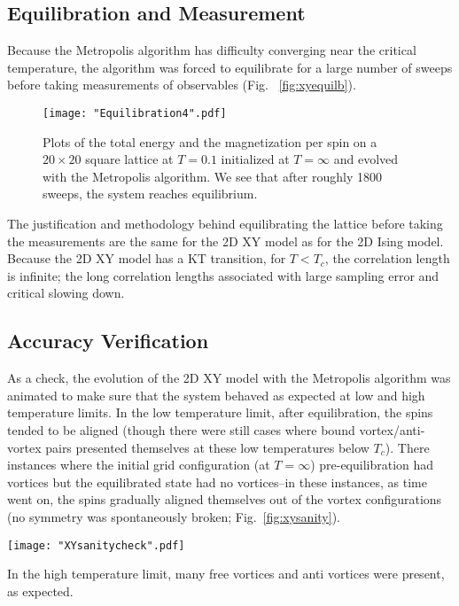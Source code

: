 \documentclass[twocolumn,aps,prl]{revtex4-1} %
\begin{document}
\subsection{Equilibration and Measurement}

Because the Metropolis algorithm has difficulty converging near the critical temperature, the algorithm was forced to equilibrate for a large number of sweeps before taking measurements of observables (Fig.~ \ref{fig:xyequilb}).
\begin{figure}
	\texttt{[image: "Equilibration4".pdf]}
	\caption{\label{fig:xyequiilb} Plots of the total energy and the magnetization per spin on a $20 \times 20$ square lattice at $T = 0.1$ initialized at $T = \infty$ and evolved with the Metropolis algorithm. We see that after roughly 1800 sweeps, the system reaches equilibrium.}
\end{figure}
The justification and methodology behind equilibrating the lattice before taking the measurements are the same for the 2D XY model as for the 2D Ising model. Because the 2D XY model has a KT transition, for $T < T_c$, the correlation length is infinite; the long correlation lengths associated with large sampling error and critical slowing down.

\subsection{Accuracy Verification}

As a check, the evolution of the 2D XY model with the Metropolis algorithm was animated to make sure that the system behaved as expected at low and high temperature limits. In the low temperature limit, after equilibration, the spins tended to be aligned (though there were still cases where bound vortex/anti-vortex pairs presented themselves at these low temperatures below $T_c$). There instances where the initial grid configuration (at $T = \infty$) pre-equilibration had vortices but the equilibrated state had no vortices--in these instances, as time went on, the spins gradually aligned themselves out of the vortex configurations (no symmetry was spontaneously broken; Fig.~\ref{fig:xysanity}). 
\begin{figure*}
	\texttt{[image: "XYsanitycheck".pdf]}
	\caption{\label{fig:xysanity} Plots of the grid configuration on a $20 \times 20$ square lattice at $T = 0.1$ initialized at $T = \infty$ and evolved with the Metropolis algorithm. We see that as the system reaches equilibrium, the free vortices go away and the spins align in a quasi-ordered state.}
\end{figure*}
In the high temperature limit, many free vortices and anti vortices were present, as expected. 
\end{document}

